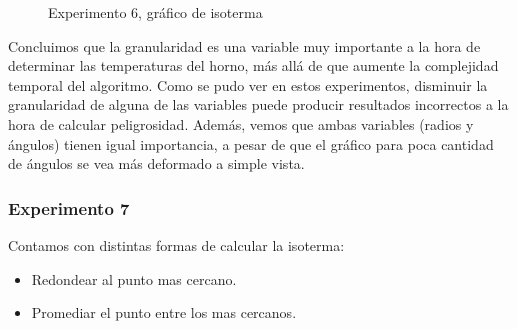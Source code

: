 \begin{figure}[ht]
\begin{center}
\caption{Experimento 6, gráfico de isoterma}
\end{center}
\end{figure}

\par Concluimos que la granularidad es una variable muy importante a la hora de determinar las temperaturas del horno, más allá de que aumente la complejidad temporal del algoritmo. Como se pudo ver en estos experimentos, disminuir la granularidad de alguna de las variables puede producir resultados incorrectos a la hora de calcular peligrosidad. Además, vemos que ambas variables (radios y ángulos) tienen igual importancia, a pesar de que el gráfico para poca cantidad de ángulos se vea más deformado a simple vista.

\subsubsection{Experimento 7}
\par Contamos con distintas formas de calcular la isoterma:
\begin{itemize}
\item Redondear al punto mas cercano.
\item Promediar el punto entre los mas cercanos.
\end{itemize}

